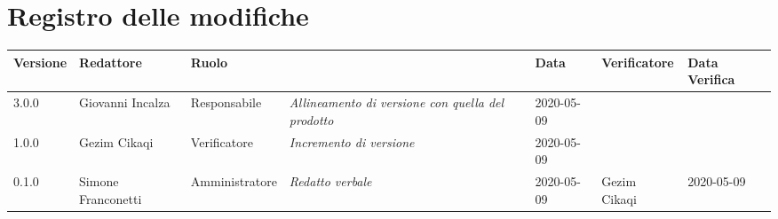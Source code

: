 \section*{Registro delle modifiche}
\renewcommand{\arraystretch}{1.8}

  \setlength\LTleft{-1.7cm}
  \begin{longtable}{|p{1.7cm}|p{2cm}|p{2.5cm}|p{3cm}|p{1.7cm}|p{2cm}|p{2.3cm}|}
    \hline

    \rowcolor{header}
    \textbf{Versione} & \textbf{Redattore} & \textbf{Ruolo} & \centering{\textbf{Descrizione}} & \textbf{Data} & \textbf{Verificatore} & \textbf{Data Verifica}\\

    \hline
    3.0.0 & Giovanni Incalza & Responsabile & \small{\textit{Allineamento di versione con quella del prodotto}} & 2020-05-09 & &\\
    1.0.0 & Gezim Cikaqi & Verificatore & \small{\textit{Incremento di versione}} & 2020-05-09 & &\\
	0.1.0 & Simone Franconetti & Amministratore & \small{\textit{Redatto verbale}} & 2020-05-09 & Gezim Cikaqi & 2020-05-09 \\
    \hline
  \end{longtable}
  \setlength\LTleft{0cm}
